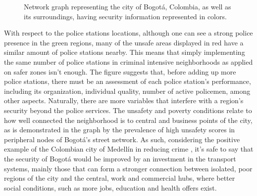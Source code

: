 \documentclass[runningheads]{llncs}
\begin{document}
\begin{figure}[!h]
  \centering
  \hfill
  \caption{Network graph representing the city of Bogotá, Colombia, as well as its surroundings, having security information represented in colors.}
  \label{fig:SafetyGraph}
\end{figure}

With respect to the police stations locations, although one can see a strong police presence in the green regions, many of the unsafe areas displayed in red have a similar amount of police stations nearby. This means that simply implementing the same number of police stations in criminal intensive neighborhoods as applied on safer zones isn't enough. The figure suggests that, before adding up more police stations, there must be an assessment of each police station's performance, including its organization, individual quality, number of active policemen, among other aspects. Naturally, there are more variables that interfere with a region's security beyond the police services. The unsafety and poverty conditions relate to how well connected the neighborhood is to central and business points of the city, as is demonstrated in the graph by the prevalence of high unsafety scores in peripheral nodes of Bogotá's street network. As such, considering the positive example of the Colombian city of Medellín in reducing crime \cite{cerda_reducing_2012}, it's safe to say that the security of Bogotá would be improved by an investment in the transport systems, mainly those that can form a stronger connection between isolated, poor regions of the city and the central, work and commercial hubs, where better social conditions, such as more jobs, education and health offers exist.
\end{document}
